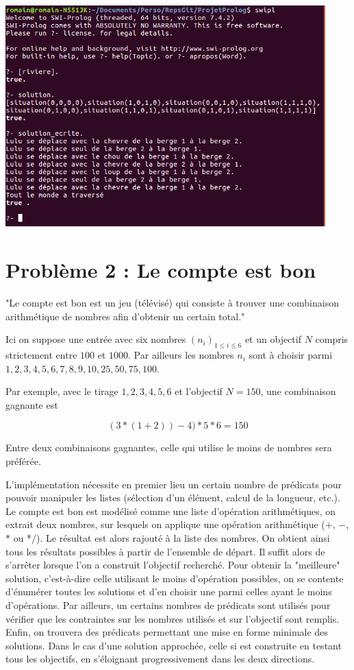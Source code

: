 \documentclass[12pt,a4paper]{article}
\begin{document}
\begin{center}
\includegraphics[width = 350pt]{SolutionRiviere.png}
\end{center}


\section{Problème 2 : Le compte est bon}
"Le compte est bon est un jeu (télévisé) qui consiste à trouver une combinaison arithmétique de nombres afin d'obtenir un certain total."

Ici on suppose une entrée avec six nombres $(n_i)_{1 \leqslant i \leqslant 6}$ et un objectif $N$ compris strictement entre $100$ et $1000$. Par ailleurs les nombres $n_i$ sont à choisir parmi $1,2,3,4,5,6,7,8,9,10,25,50,75,100$.

Par exemple, avec le tirage $1,2,3,4,5,6$ et l'objectif $N = 150$, une combinaison gagnante est 

\[ (3*(1 + 2))- 4)*5*6 = 150 \]

Entre deux combinaisons gagnantes, celle qui utilise le moins de nombres sera préférée.

L'implémentation nécessite en premier lieu un certain nombre de prédicats pour pouvoir manipuler les listes (sélection d'un élément, calcul de la longueur, etc.). Le compte est bon est modélisé comme une liste d'opération arithmétiques, on extrait deux nombres, sur lesquels on applique une opération arithmétique ($+$, $-$, $*$ ou *$/$). Le résultat est alors rajouté à la liste des nombres. On obtient ainsi tous les résultats possibles à partir de l'ensemble de départ. Il suffit alors de s'arrêter lorsque l'on a construit l'objectif recherché. Pour obtenir la "meilleure" solution, c'est-à-dire celle utilisant le moins d'opération possibles, on se contente d'énumérer toutes les solutions et d'en choisir une parmi celles ayant le moins d'opérations. Par ailleurs, un certains nombres de prédicats sont utilisés pour vérifier que les contraintes sur les nombres utilisés et sur l'objectif sont remplis. Enfin, on trouvera des prédicats permettant une mise en forme minimale des solutions.
Dans le cas d'une solution approchée, celle si est construite en testant tous les objectifs, en s'éloignant progressivement dans les deux directions.
\end{document}
